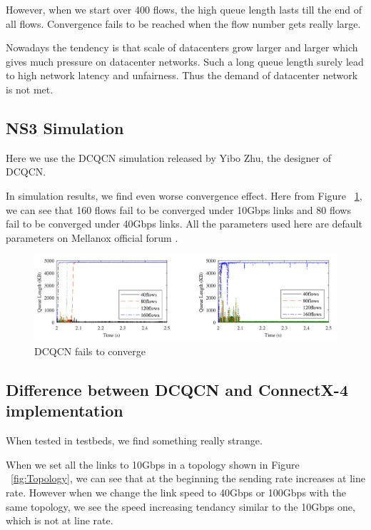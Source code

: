 \documentclass[12pt,a4paper]{article}
\begin{document}
However, when we start over 400 flows, the high queue length lasts till the end of all flows.
Convergence fails to be reached when the flow number gets really large.

Nowadays the tendency is that scale of datacenters grow larger and larger which gives much pressure on datacenter networks.
Such a long queue length surely lead to high network latency and unfairness.
Thus the demand of datacenter network is not met.

\subsection{NS3 Simulation}

Here we use the DCQCN simulation \cite{DCQCNsim} released by Yibo Zhu, the designer of DCQCN.

In simulation results, we find even worse convergence effect.
Here from Figure ~\ref{fig:DCQCNfail}, we can see that 160 flows fail to be converged under 10Gbps links and 80 flows fail to 
be converged under 40Gbps links.
All the parameters used here are default parameters on Mellanox official forum \cite{MellanoxOfficial}.

\begin{figure}[ht]
	\begin{center}
		\includegraphics[width=6in]{DCQCNfail}
		\caption{DCQCN fails to converge}
		\label{fig:DCQCNfail}
	\end{center}
\end{figure}

\subsection{Difference between DCQCN and ConnectX-4 implementation}

When tested in testbeds, we find something really strange.

When we set all the links to 10Gbps in a topology shown in Figure ~\ref{fig:Topology},
we can see that at the beginning the sending rate increases at line rate.
However when we change the link speed to 40Gbps or 100Gbps with the same topology,
we see the speed increasing tendancy similar to the 10Gbps one, which is not at line rate.
\end{document}
